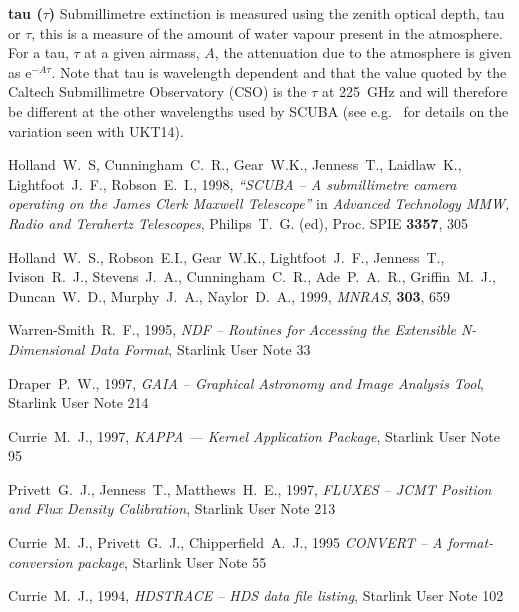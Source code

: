 \documentclass[twoside,11pt]{article}
\newcommand{\htmladdnormallink}[2]{#1}
\newcommand{\xref}[3]{#1}
\renewcommand{\_}{\texttt{\symbol{95}}}
\begin{document}
\begin{description}
\item{{\bf tau ($\tau$)}} Submillimetre extinction is measured using the
zenith optical depth, tau or $\tau$, this is a measure of the amount of water
vapour present in the atmosphere. For a tau, $\tau$ at a given airmass, $A$,
the attenuation due to the atmosphere is given as e$^{-A \tau}$. Note that tau
is wavelength dependent and that the value quoted by the 
\htmladdnormallink{Caltech Submillimetre Observatory}{http://www.cco.caltech.edu/\~{}cso/} (CSO) is the $\tau$ at 225~GHz and will therefore be different at
the other wavelengths used by SCUBA (see e.g.\ \cite{SR94} for details on the
variation seen with UKT14).

\end{description}

\clearpage
\begin{thebibliography}{}

Holland~W.~S, Cunningham~C.~R., Gear~W.K., Jenness~T., Laidlaw~K.,
Lightfoot~J.~F., Robson~E.~I., 1998, \textit{``SCUBA -- A submillimetre camera
operating on the James Clerk Maxwell Telescope''} in \textit{Advanced
Technology MMW, Radio and Terahertz Telescopes}, Philips~T.~G. (ed),
Proc. SPIE \textbf{3357}, 305

Holland~W.~S., Robson~E.I., Gear~W.K., Lightfoot~J.~F., Jenness~T.,
Ivison~R.~J., Stevens~J.~A., Cunningham~C.~R., Ade~P.~A.~R.,
Griffin~M.~J., Duncan~W.~D., Murphy~J.~A., Naylor~D.~A., 1999,
\textit{MNRAS}, \textbf{303}, 659

Warren-Smith~R.~F., 1995, {\it NDF -- Routines for Accessing the Extensible
N-Dimensional Data Format}, \xref{Starlink User Note 33}{sun33}{}

Draper~P.~W., 1997, {\it GAIA -- Graphical Astronomy and Image Analysis Tool},
\xref{Starlink User Note 214}{sun214}{}

Currie~M.~J., 1997, {\it KAPPA --- Kernel Application Package},
\xref{Starlink User Note 95}{sun95}{}

Privett~G.~J., Jenness~T., Matthews~H.~E., 1997, {\it FLUXES --
JCMT Position and Flux Density Calibration}, 
\xref{Starlink User Note 213}{sun213}{}

Currie~M.~J., Privett~G.~J., Chipperfield~A.~J., 1995 {\it CONVERT --
A format-conversion package}, \xref{Starlink User Note 55}{sun55}{}

Currie~M.~J., 1994, {\it HDSTRACE -- HDS data file listing}, 
\xref{Starlink User Note 102}{sun102}{}


\end{thebibliography}
\end{document}
